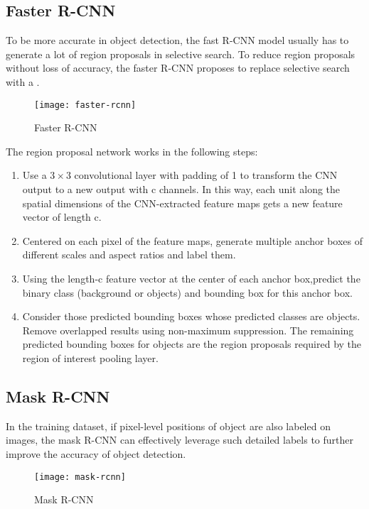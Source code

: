 \subsection{Faster R-CNN}
\label{sec:faster-r-cnn}

To be more accurate in object detection, the fast R-CNN model usually has to generate a lot of region proposals in selective search.
To reduce region proposals without loss of accuracy, the faster R-CNN proposes to replace selective search with a .

\begin{figure}[H]
  \centering
  \texttt{[image: faster-rcnn]}
  \caption{Faster R-CNN}
  \label{fig:faster-rcnn}
\end{figure}

The region proposal network works in the following steps:
\begin{enumerate}
\item Use a \(3 × 3\) convolutional layer with padding of 1 to transform the CNN output to a new output with c channels.
  In this way, each unit along the spatial dimensions of the CNN-extracted feature maps gets a new feature vector of length c.
\item Centered on each pixel of the feature maps, generate multiple anchor boxes of different scales and aspect ratios and label them.
\item Using the length-c feature vector at the center of each anchor box,predict the binary class (background or objects) and bounding box for this anchor box.
\item Consider those predicted bounding boxes whose predicted classes are objects.
  Remove overlapped results using non-maximum suppression.
  The remaining predicted bounding boxes for objects are the region proposals required by the region of interest pooling layer.
\end{enumerate}


\subsection{Mask R-CNN}
\label{sec:mask-r-cnn}

In the training dataset, if pixel-level positions of object are also labeled on images, the mask R-CNN can effectively leverage such detailed labels to further improve the accuracy of object detection.


\begin{figure}[H]
  \centering
  \texttt{[image: mask-rcnn]}
  \caption{Mask R-CNN}
  \label{fig:mask-rcnn}
\end{figure}

